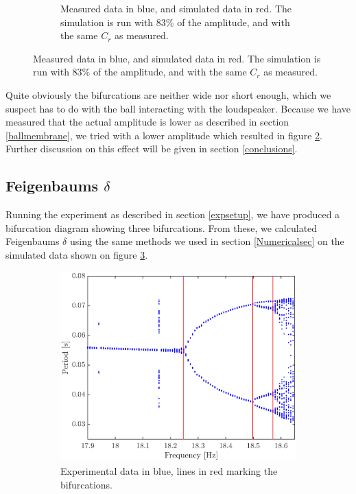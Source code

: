 \documentclass[12pt,oneside,a4paper]{article}
\numberwithin{equation}{section}
\begin{document}
{{{{\begin{figure}
\begin{subfigure}[t]{0.49\textwidth}
	\caption{Measured data in blue, and simulated data in red. The simulation is run with 83\% of the amplitude, and with the same $C_r$ as measured.}
	\label{fakedata}
\end{subfigure}
\end{figure}
Quite obviously the bifurcations are neither wide nor short enough, which we 
suspect has to do with the ball interacting with the loudspeaker. Because we 
have measured that the actual amplitude is lower as described in section 
\ref{ballmembrane}, we tried with a lower amplitude which resulted in figure 
\ref{fakedata}. Further discussion on this effect will be given in section 
\ref{conclusions}.

\subsection{Feigenbaums $\delta$}
Running the experiment as described in section \ref{expsetup}, we have produced a bifurcation diagram showing three bifurcations. From these, we calculated Feigenbaums $\delta$ using the same methods we used in section \ref{Numericalsec} on the simulated data shown on figure \ref{expfeigplot}.
\begin{figure}[h]
\centering
\begin{subfigure}[t]{0.49\textwidth}
\centering
\includegraphics[width=\textwidth]{feigplotexp}
\caption{Experimental data in blue, lines in red marking the bifurcations.}
\label{expfeigplot}
\end{subfigure} \hfill
\begin{subfigure}[t]{0.49\textwidth}

\end{subfigure}
\end{figure}}}}}
\end{document}
